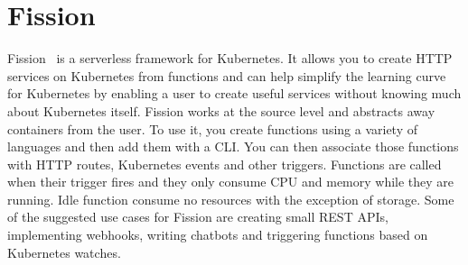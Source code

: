 \section{Fission}

Fission~\cite{hid-sp18-521-FissionBlog} is a serverless framework for
Kubernetes. It allows you to create HTTP services on Kubernetes from
functions and can help simplify the learning curve for Kubernetes by
enabling a user to create useful services without knowing much about
Kubernetes itself. Fission works at the source level and abstracts 
away containers from the user. To use it, you create functions using
a variety of languages and then add them with a CLI. You can then 
associate those functions with HTTP routes, Kubernetes events and 
other triggers. Functions are called when their trigger fires and 
they only consume CPU and memory while they are running. Idle function 
consume no resources with the exception of storage. Some of the 
suggested use cases for Fission are creating small REST APIs, 
implementing webhooks, writing chatbots and triggering functions 
based on Kubernetes watches.
